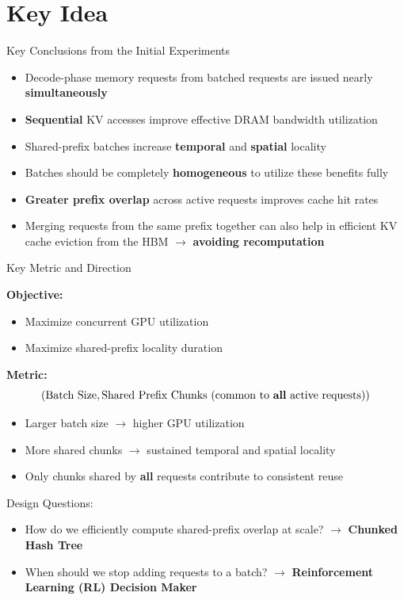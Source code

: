 \documentclass[Serif, 10pt, brown]{beamer}
\theoremstyle{example}
\theoremstyle{plain}
\begin{document}
\section{Key Idea}
\begin{frame}{Key Conclusions from the Initial Experiments}
  \begin{itemize}
    \item Decode-phase memory requests from batched requests are issued nearly \textbf{simultaneously}
    \item \textbf{Sequential} KV accesses improve effective DRAM bandwidth utilization
    \item Shared-prefix batches increase \textbf{temporal} and \textbf{spatial} locality
    \item Batches should be completely \textbf{homogeneous} to utilize these benefits fully
    \item \textbf{Greater prefix overlap} across active requests improves cache hit rates
    \item Merging requests from the same prefix together can also help in efficient KV cache eviction from the HBM $\rightarrow$ \textbf{avoiding recomputation}
  \end{itemize}
\end{frame}


\begin{frame}{Key Metric and Direction}

\textbf{Objective:}
\begin{itemize}
    \item Maximize concurrent GPU utilization
    \item Maximize shared-prefix locality duration
\end{itemize}
\vspace{0.2cm}

\textbf{Metric:}
\vspace{-0.2cm}
\[
(\text{Batch Size}, \text{Shared Prefix Chunks (common to \textbf{all} active requests)})
\]
\vspace{-0.7cm}
\begin{itemize}
    \item Larger batch size $\rightarrow$ higher GPU utilization
    \item More shared chunks $\rightarrow$ sustained temporal and spatial locality
    \item Only chunks shared by \textbf{all} requests contribute to consistent reuse
\end{itemize}

\begin{block}{Design Questions:}
    \begin{itemize}
    \item How do we efficiently compute shared-prefix overlap at scale? 
          $\rightarrow$ \textbf{Chunked Hash Tree}
    \item When should we stop adding requests to a batch?
          $\rightarrow$ \textbf{Reinforcement Learning (RL) Decision Maker}
\end{itemize}
\end{block}

\end{frame}
\end{document}
